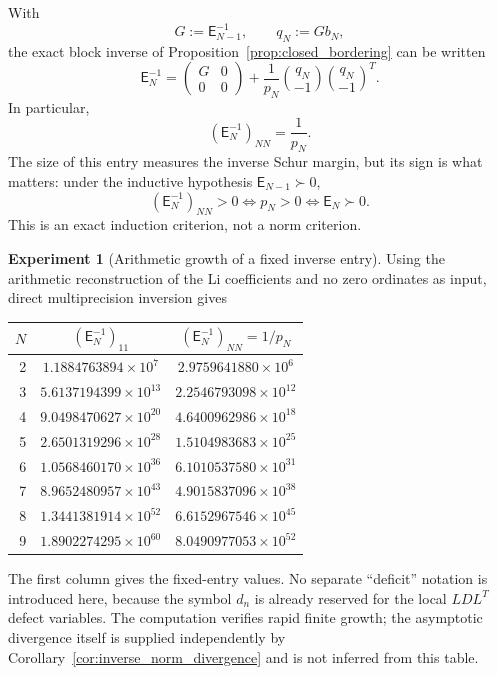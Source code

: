 \documentclass[11pt]{amsart}
\numberwithin{equation}{section}
\theoremstyle{plain}
\theoremstyle{definition}
\newtheorem{experiment}[theorem]{Experiment}
\theoremstyle{remark}
\newcommand{\E}{\mathsf E}
\begin{document}
With
\[
G:=\E_{N-1}^{-1},
\qquad
q_N:=Gb_N,
\]
the exact block inverse of Proposition~\ref{prop:closed_bordering} can be written
\begin{equation}
\boxed{
\E_N^{-1}
=
\begin{pmatrix}G&0\\0&0\end{pmatrix}
+
\frac1{p_N}
\binom{q_N}{-1}
\binom{q_N}{-1}^{\!T}.}
\label{eq:routeB_rankone_update}
\end{equation}
In particular,
\begin{equation}
\boxed{
(\E_N^{-1})_{NN}=\frac1{p_N}.}
\label{eq:routeB_corner_inverse}
\end{equation}
The size of this entry measures the inverse Schur margin, but its sign is what matters:
under the inductive hypothesis \(\E_{N-1}\succ0\),
\[
(\E_N^{-1})_{NN}>0
\Longleftrightarrow
p_N>0
\Longleftrightarrow
\E_N\succ0.
\]
This is an exact induction criterion, not a norm criterion.

\begin{experiment}[Arithmetic growth of a fixed inverse entry]
\label{exp:routeB_inverse11}
Using the arithmetic reconstruction of the Li coefficients and no zero ordinates as input, direct
multiprecision inversion gives
\begin{center}
\small
\begin{tabular}{rcc}
\toprule
\(N\)&\((\E_N^{-1})_{11}\)&\((\E_N^{-1})_{NN}=1/p_N\)\\
\midrule
2&\(1.1884763894\times10^{7}\)&\(2.9759641880\times10^{6}\)\\
3&\(5.6137194399\times10^{13}\)&\(2.2546793098\times10^{12}\)\\
4&\(9.0498470627\times10^{20}\)&\(4.6400962986\times10^{18}\)\\
5&\(2.6501319296\times10^{28}\)&\(1.5104983683\times10^{25}\)\\
6&\(1.0568460170\times10^{36}\)&\(6.1010537580\times10^{31}\)\\
7&\(8.9652480957\times10^{43}\)&\(4.9015837096\times10^{38}\)\\
8&\(1.3441381914\times10^{52}\)&\(6.6152967546\times10^{45}\)\\
9&\(1.8902274295\times10^{60}\)&\(8.0490977053\times10^{52}\)\\
\bottomrule
\end{tabular}
\end{center}
The first column gives the fixed-entry values.  No separate
``deficit'' notation is introduced here, because the symbol $d_n$ is already reserved for the local
$LDL^T$ defect variables.  The computation verifies rapid finite growth; the asymptotic divergence
itself is supplied independently by Corollary~\ref{cor:inverse_norm_divergence} and is not inferred
from this table.
\end{experiment}
\end{document}

